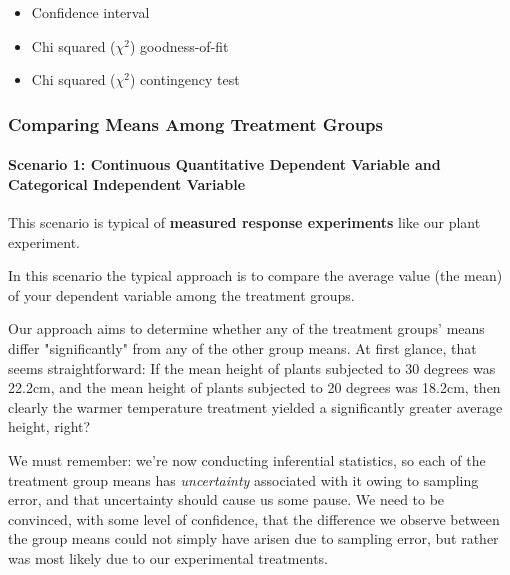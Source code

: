 \documentclass[
]{book}
\providecommand{\tightlist}{%
  \setlength{\itemsep}{0pt}\setlength{\parskip}{0pt}}
\begin{document}
\begin{itemize}
\tightlist
\item
  Confidence interval
\item
  Chi squared (\(\chi{^2}\)) goodness-of-fit
\item
  Chi squared (\(\chi{^2}\)) contingency test
\end{itemize}

\hypertarget{comparing-means-among-treatment-groups}{%
\subsubsection*{Comparing Means Among Treatment Groups}\label{comparing-means-among-treatment-groups}}

\hypertarget{scenario-1-continuous-quantitative-dependent-variable-and-categorical-independent-variable}{%
\paragraph*{Scenario 1: Continuous Quantitative Dependent Variable and Categorical Independent Variable}\label{scenario-1-continuous-quantitative-dependent-variable-and-categorical-independent-variable}}

This scenario is typical of \textbf{measured response experiments} like our plant experiment.

In this scenario the typical approach is to compare the average value (the mean) of your dependent variable among the treatment groups.

Our approach aims to determine whether any of the treatment groups' means differ "significantly" from any of the other group means. At first glance, that seems straightforward: If the mean height of plants subjected to 30 degrees was 22.2cm, and the mean height of plants subjected to 20 degrees was 18.2cm, then clearly the warmer temperature treatment yielded a significantly greater average height, right?

We must remember: we're now conducting inferential statistics, so each of the treatment group means has \emph{uncertainty} associated with it owing to sampling error, and that uncertainty should cause us some pause. We need to be convinced, with some level of confidence, that the difference we observe between the group means could not simply have arisen due to sampling error, but rather was most likely due to our experimental treatments.
\end{document}
